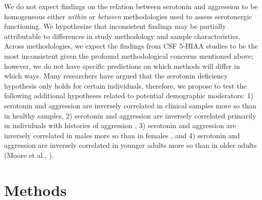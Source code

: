 We do not expect findings on the relation between serotonin and aggression to be homogeneous either \emph{within} or \emph{between} methodologies used to assess serotonergic functioning. We hypothesize that inconsistent findings may be partially attributable to differences in study methodology and sample characteristics. Across methodologies, we expect the findings from CSF 5-HIAA studies to be the most inconsistent given the profound methodological concerns mentioned above; however, we do not have specific predictions on which methods will differ in which ways. Many researchers have argued that the serotonin deficiency hypothesis only holds for certain individuals, therefore, we propose to test the following additional hypotheses related to potential demographic moderators: 1) serotonin and aggression are inversely correlated in clinical samples more so than in healthy samples, 2) serotonin and aggression are inversely correlated primarily in individuals with histories of aggression \parencite[see][]{Booij03}, 3) serotonin and aggression are inversely correlated in males more so than in females \parencite[e.g.,][]{Tuinier96}, and 4) serotonin and aggression are inversely correlated in younger adults more so than in older adults (Moore et al., \citeyear{Moore2002}).


\section{Methods}
